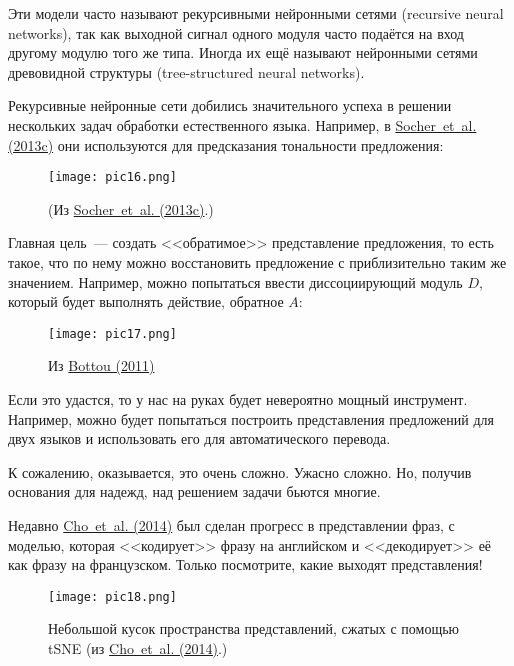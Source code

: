 \documentclass[a4paper,12pt]{article}
\begin{document}
Эти модели часто называют рекурсивными нейронными сетями (recursive neural networks), так как выходной сигнал одного модуля часто подаётся на вход другому модулю того же типа. Иногда их ещё называют нейронными сетями древовидной структуры (tree-structured neural networks).

Рекурсивные нейронные сети добились значительного успеха в решении нескольких задач обработки естественного языка. Например, в \href{http://nlp.stanford.edu/~socherr/EMNLP2013_RNTN.pdf}{Socher~et~al. (2013c)} они используются для предсказания тональности предложения:

\begin{figure}[t]
\begin{center}
\texttt{[image: pic16.png]}
\caption{(Из \href{http://nlp.stanford.edu/~socherr/EMNLP2013_RNTN.pdf}{Socher~et~al. (2013c)}.)}
\end{center}
\end{figure}

Главная цель~--- создать <<обратимое>> представление предложения, то есть такое, что по нему можно восстановить предложение с приблизительно таким же значением. Например, можно попытаться ввести диссоциирующий модуль $D$, который будет выполнять действие, обратное $A$:

\begin{figure}[t]
\begin{center}
\texttt{[image: pic17.png]}
\caption{Из \href{http://arxiv.org/pdf/1102.1808v3.pdf}{Bottou (2011)}}
\end{center}
\end{figure}

Если это удастся, то у нас на руках будет невероятно мощный инструмент. Например, можно будет попытаться построить представления предложений для двух языков и использовать его для автоматического перевода.

К сожалению, оказывается, это очень сложно. Ужасно сложно. Но, получив основания для надежд, над решением задачи бьются многие.

Недавно  \href{http://arxiv.org/pdf/1406.1078v1.pdf}{Cho~et~al. (2014)} был сделан прогресс в представлении фраз, с моделью, которая <<кодирует>> фразу на английском и <<декодирует>> её как фразу на французском. Только посмотрите, какие выходят представления!

\begin{figure}[t]
\begin{center}
\texttt{[image: pic18.png]}
\caption{Небольшой кусок пространства представлений, сжатых с помощью tSNE (из \href{http://arxiv.org/pdf/1406.1078v1.pdf}{Cho~et~al. (2014)}.)}
\end{center}
\end{figure}
\end{document}
